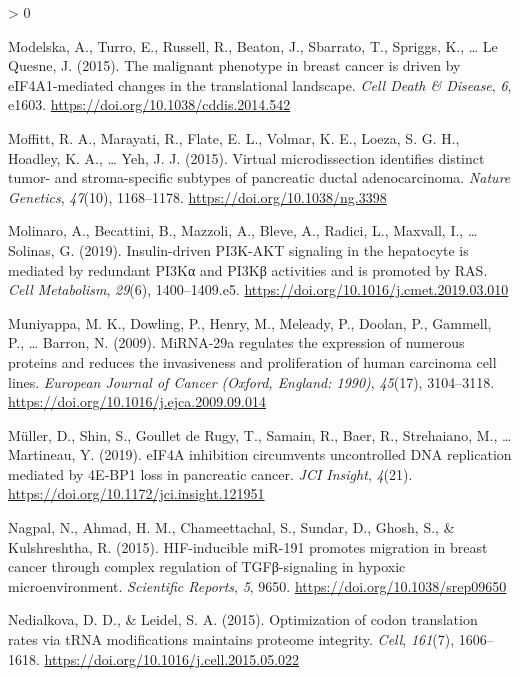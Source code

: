 \documentclass[
  12pt,
  openany]{book}
\newlength{\cslhangindent}
\newenvironment{CSLReferences}[2] %
 {%
  \setlength{\parindent}{0pt}
  \ifodd #1 \everypar{\setlength{\hangindent}{\cslhangindent}}\ignorespaces\fi
  \ifnum #2 > 0
  \setlength{\parskip}{#2\baselineskip}
  \fi
 }%
 {}
\begin{document}
\begin{CSLReferences}{1}{0}
\leavevmode\hypertarget{ref-Modelska2015}{}%
Modelska, A., Turro, E., Russell, R., Beaton, J., Sbarrato, T., Spriggs, K., \ldots{} Le Quesne, J. (2015). The malignant phenotype in breast cancer is driven by {eIF}4A1-mediated changes in the translational landscape. \emph{Cell Death \& Disease}, \emph{6}, e1603. \url{https://doi.org/10.1038/cddis.2014.542}

\leavevmode\hypertarget{ref-Moffitt2015}{}%
Moffitt, R. A., Marayati, R., Flate, E. L., Volmar, K. E., Loeza, S. G. H., Hoadley, K. A., \ldots{} Yeh, J. J. (2015). Virtual microdissection identifies distinct tumor- and stroma-specific subtypes of pancreatic ductal adenocarcinoma. \emph{Nature Genetics}, \emph{47}(10), 1168--1178. \url{https://doi.org/10.1038/ng.3398}

\leavevmode\hypertarget{ref-Molinaro2019}{}%
Molinaro, A., Becattini, B., Mazzoli, A., Bleve, A., Radici, L., Maxvall, I., \ldots{} Solinas, G. (2019). Insulin-driven {PI}3K-{AKT} signaling in the hepatocyte is mediated by redundant {PI}3Kα and {PI}3Kβ activities and is promoted by {RAS}. \emph{Cell Metabolism}, \emph{29}(6), 1400--1409.e5. \url{https://doi.org/10.1016/j.cmet.2019.03.010}

\leavevmode\hypertarget{ref-Muniyappa2009}{}%
Muniyappa, M. K., Dowling, P., Henry, M., Meleady, P., Doolan, P., Gammell, P., \ldots{} Barron, N. (2009). {MiRNA}-29a regulates the expression of numerous proteins and reduces the invasiveness and proliferation of human carcinoma cell lines. \emph{European Journal of Cancer (Oxford, England: 1990)}, \emph{45}(17), 3104--3118. \url{https://doi.org/10.1016/j.ejca.2009.09.014}

\leavevmode\hypertarget{ref-Muller2019}{}%
Müller, D., Shin, S., Goullet de Rugy, T., Samain, R., Baer, R., Strehaiano, M., \ldots{} Martineau, Y. (2019). {eIF}4A inhibition circumvents uncontrolled {DNA} replication mediated by 4E-{BP}1 loss in pancreatic cancer. \emph{{JCI} Insight}, \emph{4}(21). \url{https://doi.org/10.1172/jci.insight.121951}

\leavevmode\hypertarget{ref-Nagpal2015}{}%
Nagpal, N., Ahmad, H. M., Chameettachal, S., Sundar, D., Ghosh, S., \& Kulshreshtha, R. (2015). {HIF}-inducible {miR}-191 promotes migration in breast cancer through complex regulation of {TGFβ}-signaling in hypoxic microenvironment. \emph{Scientific Reports}, \emph{5}, 9650. \url{https://doi.org/10.1038/srep09650}

\leavevmode\hypertarget{ref-Nedialkova2015}{}%
Nedialkova, D. D., \& Leidel, S. A. (2015). Optimization of codon translation rates via {tRNA} modifications maintains proteome integrity. \emph{Cell}, \emph{161}(7), 1606--1618. \url{https://doi.org/10.1016/j.cell.2015.05.022}


\end{CSLReferences}
\end{document}
